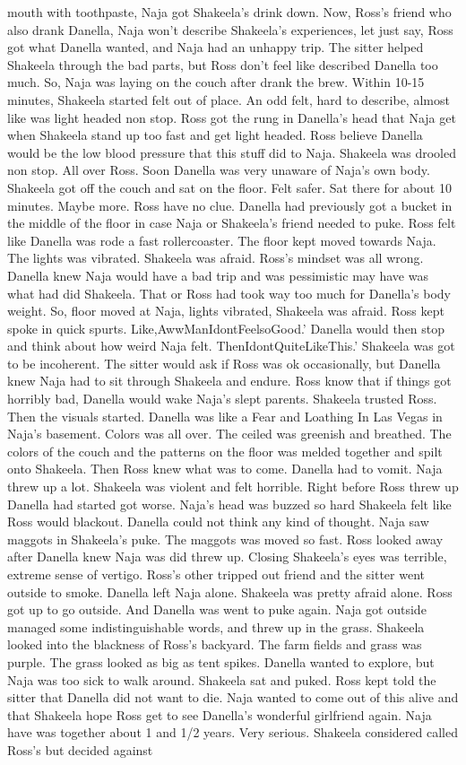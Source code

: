 \documentclass[12pt]{book}
\begin{document}
mouth with toothpaste, Naja got Shakeela's drink down. Now, Ross's friend who also drank Danella, Naja won't describe Shakeela's experiences, let just say, Ross got what Danella wanted, and Naja had an unhappy trip. The sitter helped Shakeela through the bad parts, but Ross don't feel like described Danella too much. So, Naja was laying on the couch after drank the brew. Within 10-15 minutes, Shakeela started felt out of place. An odd felt, hard to describe, almost like was light headed non stop. Ross got the rung in Danella's head that Naja get when Shakeela stand up too fast and get light headed. Ross believe Danella would be the low blood pressure that this stuff did to Naja. Shakeela was drooled non stop. All over Ross. Soon Danella was very unaware of Naja's own body. Shakeela got off the couch and sat on the floor. Felt safer. Sat there for about 10 minutes. Maybe more. Ross have no clue. Danella had previously got a bucket in the middle of the floor in case Naja or Shakeela's friend needed to puke. Ross felt like Danella was rode a fast rollercoaster. The floor kept moved towards Naja. The lights was vibrated. Shakeela was afraid. Ross's mindset was all wrong. Danella knew Naja would have a bad trip and was pessimistic may have was what had did Shakeela. That or Ross had took way too much for Danella's body weight. So, floor moved at Naja, lights vibrated, Shakeela was afraid. Ross kept spoke in quick spurts. Like,AwwManIdontFeelsoGood.' Danella would then stop and think about how weird Naja felt. ThenIdontQuiteLikeThis.' Shakeela was got to be incoherent. The sitter would ask if Ross was ok occasionally, but Danella knew Naja had to sit through Shakeela and endure. Ross know that if things got horribly bad, Danella would wake Naja's slept parents. Shakeela trusted Ross. Then the visuals started. Danella was like a Fear and Loathing In Las Vegas in Naja's basement. Colors was all over. The ceiled was greenish and breathed. The colors of the couch and the patterns on the floor was melded together and spilt onto Shakeela. Then Ross knew what was to come. Danella had to vomit. Naja threw up a lot. Shakeela was violent and felt horrible. Right before Ross threw up Danella had started got worse. Naja's head was buzzed so hard Shakeela felt like Ross would blackout. Danella could not think any kind of thought. Naja saw maggots in Shakeela's puke. The maggots was moved so fast. Ross looked away after Danella knew Naja was did threw up. Closing Shakeela's eyes was terrible, extreme sense of vertigo. Ross's other tripped out friend and the sitter went outside to smoke. Danella left Naja alone. Shakeela was pretty afraid alone. Ross got up to go outside. And Danella was went to puke again. Naja got outside managed some indistinguishable words, and threw up in the grass. Shakeela looked into the blackness of Ross's backyard. The farm fields and grass was purple. The grass looked as big as tent spikes. Danella wanted to explore, but Naja was too sick to walk around. Shakeela sat and puked. Ross kept told the sitter that Danella did not want to die. Naja wanted to come out of this alive and that Shakeela hope Ross get to see Danella's wonderful girlfriend again. Naja have was together about 1 and 1/2 years. Very serious. Shakeela considered called Ross's but decided against 
\end{document}
